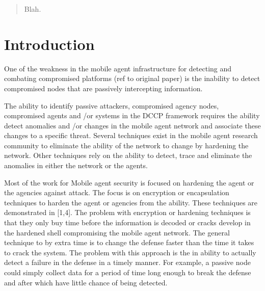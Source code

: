 \documentclass{acm_proc_article-sp}
\begin{document}
\maketitle
\begin{abstract}
Blah.
\end{abstract}




\section{Introduction}




One of the weakness in the mobile agent infrastructure for detecting and combating compromised platforms (ref to original paper) is the inability to detect compromised nodes that are passively intercepting information.

The ability to identify passive attackers, compromised agency nodes, compromised agents and /or systems in the DCCP framework requires the ability detect anomalies and /or changes in the mobile agent network and associate these changes to a specific threat. Several techniques exist in the mobile agent research community to eliminate the ability of the network to change by hardening the network. Other techniques rely on the ability to detect, trace and eliminate the anomalies in either the network or the agents. 
 
Most of the work for Mobile agent security is focused on hardening the agent or the agencies against attack. The focus is on encryption or encapsulation techniques to harden the agent or agencies from the ability. These techniques are demonstrated in [1,4]. The problem with encryption or hardening techniques is that they only buy time before the information is decoded or cracks develop in the hardened shell compromising the mobile agent network. The general technique to by extra time is to change the defense faster than the time it takes to crack the system. The problem with this approach is the in ability to actually detect a failure in the defense in a timely manner. For example, a passive node could simply collect data for a period of time long enough to break the defense and after which have little chance of being detected.  
\end{document}
